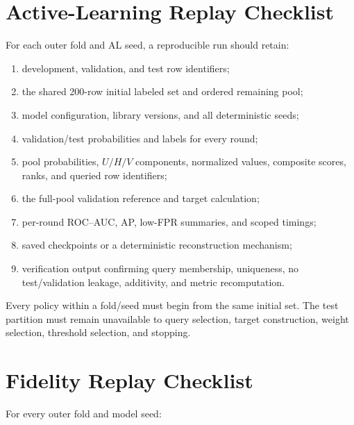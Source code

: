 \section{Active-Learning Replay Checklist}
\label{app:al}

For each outer fold and AL seed, a reproducible run should retain:

\begin{enumerate}
    \item development, validation, and test row identifiers;
    \item the shared 200-row initial labeled set and ordered remaining pool;
    \item model configuration, library versions, and all deterministic seeds;
    \item validation/test probabilities and labels for every round;
    \item pool probabilities, $U/H/V$ components, normalized values, composite
    scores, ranks, and queried row identifiers;
    \item the full-pool validation reference and target calculation;
    \item per-round ROC--AUC, AP, low-FPR summaries, and scoped timings;
    \item saved checkpoints or a deterministic reconstruction mechanism;
    \item verification output confirming query membership, uniqueness, no
    test/validation leakage, additivity, and metric recomputation.
\end{enumerate}

Every policy within a fold/seed must begin from the same initial set. The test
partition must remain unavailable to query selection, target construction,
weight selection, threshold selection, and stopping.

\section{Fidelity Replay Checklist}
\label{app:fidelity}

For every outer fold and model seed:

